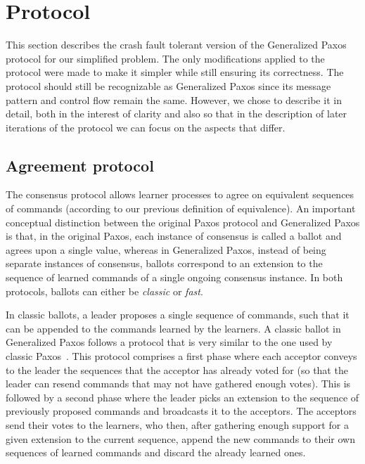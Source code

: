 \section{Protocol} 

This section describes the crash fault tolerant version of the Generalized Paxos protocol for our simplified problem. The only modifications applied to the protocol were made to make it simpler while still ensuring its correctness. The protocol should still be recognizable as Generalized Paxos since its message pattern and control flow remain the same. However, we chose to describe it in detail, both in the interest of clarity and also so that in the description of later iterations of the protocol we can focus on the aspects that differ. 

\subsection{Agreement protocol} 

The consensus protocol allows learner processes to agree on equivalent sequences of commands (according to our previous definition of equivalence).
An important conceptual distinction between the original Paxos protocol and Generalized Paxos is that, in the original Paxos, each instance of consensus is called a ballot and agrees upon a single value, whereas in Generalized Paxos, instead of being separate instances of consensus, ballots correspond to an extension to the sequence of learned commands of a single ongoing consensus instance.
In both protocols, ballots can either be \textit{classic} or \textit{fast}. \par

In classic ballots, a leader proposes a single sequence of commands, such that it can be appended to the commands learned by the learners. 
A classic ballot in Generalized Paxos follows a protocol that is very similar to the one used by classic Paxos~\cite{Lam98}. This protocol comprises a first phase where each acceptor conveys to the leader the sequences that the acceptor has already voted for (so that the leader can resend commands that may not have gathered enough votes).
This is followed by a second phase where the leader picks an extension to the sequence of previously proposed commands and broadcasts it to the acceptors. The acceptors send their votes to the learners, who then, after gathering enough support for a given extension to the current sequence, append the new commands to their own sequences of learned commands and discard the already learned ones.\par

